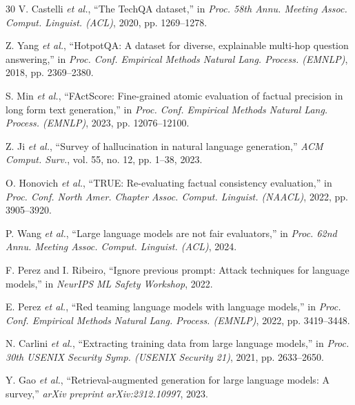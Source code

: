 \documentclass[conference]{IEEEtran}
\begin{document}
\begin{thebibliography}{30}
V. Castelli \emph{et al.}, ``The TechQA dataset,'' in \emph{Proc. 58th Annu. Meeting Assoc. Comput. Linguist. (ACL)}, 2020, pp. 1269--1278.

Z. Yang \emph{et al.}, ``HotpotQA: A dataset for diverse, explainable multi-hop question answering,'' in \emph{Proc. Conf. Empirical Methods Natural Lang. Process. (EMNLP)}, 2018, pp. 2369--2380.

S. Min \emph{et al.}, ``FActScore: Fine-grained atomic evaluation of factual precision in long form text generation,'' in \emph{Proc. Conf. Empirical Methods Natural Lang. Process. (EMNLP)}, 2023, pp. 12076--12100.

Z. Ji \emph{et al.}, ``Survey of hallucination in natural language generation,'' \emph{ACM Comput. Surv.}, vol. 55, no. 12, pp. 1--38, 2023.

O. Honovich \emph{et al.}, ``TRUE: Re-evaluating factual consistency evaluation,'' in \emph{Proc. Conf. North Amer. Chapter Assoc. Comput. Linguist. (NAACL)}, 2022, pp. 3905--3920.

P. Wang \emph{et al.}, ``Large language models are not fair evaluators,'' in \emph{Proc. 62nd Annu. Meeting Assoc. Comput. Linguist. (ACL)}, 2024.

F. Perez and I. Ribeiro, ``Ignore previous prompt: Attack techniques for language models,'' in \emph{NeurIPS ML Safety Workshop}, 2022.

E. Perez \emph{et al.}, ``Red teaming language models with language models,'' in \emph{Proc. Conf. Empirical Methods Natural Lang. Process. (EMNLP)}, 2022, pp. 3419--3448.

N. Carlini \emph{et al.}, ``Extracting training data from large language models,'' in \emph{Proc. 30th USENIX Security Symp. (USENIX Security 21)}, 2021, pp. 2633--2650.

Y. Gao \emph{et al.}, ``Retrieval-augmented generation for large language models: A survey,'' \emph{arXiv preprint arXiv:2312.10997}, 2023.

\end{thebibliography}
\end{document}
